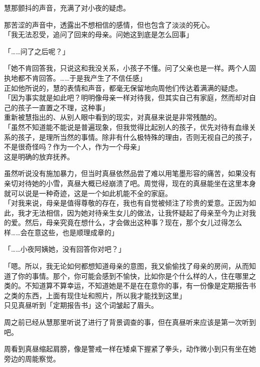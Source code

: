 慧那颤抖的声音，充满了对小夜的疑虑。

那苦涩的声音中，透露出不想相信的感情，但也包含了淡淡的死心。\\

「我无法忍受，追问了回来的母亲。问她这到底是怎么回事」

「……问了之后呢？」

「她不肯回答我，只说这和我没关系，小孩子不懂。问了父亲也是一样。两个人固执地都不肯回答。……于是我产生了不信任感」\\

正如他所说的，慧的表情和声音，都毫无保留地向周他们传达着满满的疑虑。\\

「因为事实就是如此吧？明明像母亲一样对待我，但其实自己有家庭，然而却对自己的孩子一直置之不理，这种事」\\

重新被慧指出的、从别人眼中看到的现实，对真昼来说是非常残酷的。\\

「虽然不知道能不能说是普遍现象，但我觉得比起别人的孩子，优先对待有血缘关系的孩子，是理所当然的事情。除非有什么极特殊的理由，否则无视自己的孩子，不是很奇怪吗？作为一个人，作为一个母亲」\\

这是明确的放弃抚养。

虽然听说没有施加暴力，但当时真昼依然品尝了难以用笔墨形容的痛苦，如果没有亲切对待她的小雪，真昼大概已经崩溃了吧。周觉得，现在的真昼能坐在这里本身就可以说是一种奇迹，这是一个如此机能不全的家庭。\\

「对我来说，母亲是值得尊敬的存在，我也有自觉被倾注了珍贵的爱意。正因为如此，我才无法相信，因为她对待亲生女儿的做法，让我怀疑起了母亲至今为止对我的爱。然后，母亲究竟在想什么，才会做出这种事？现在，那个女儿过得怎么样……会在意这些，也是顺理成章的」

「……小夜阿姨她，没有回答你对吧？」

「嗯。所以，我无论如何都想知道母亲的意图，我又偷偷找了母亲的房间，从而知道了你的事情。那个，你可能会感到不愉快，比如你是个什么样的人，住在哪里之类的。不知道算不算幸运，不知道她是不是在在意你的事，有一份像是定期报告书之类的东西，上面有现住址和照片，所以我才能找到这里」\\

只见真昼听到「定期报告书」这个词皱起了眉头。

周之前已经从慧那里听说了进行了背景调查的事，但在真昼听来应该是第一次听到吧。

周看到真昼缩起肩膀，像是警戒一样在矮桌下握紧了拳头，动作微小到只有坐在她旁边的周能察觉。

